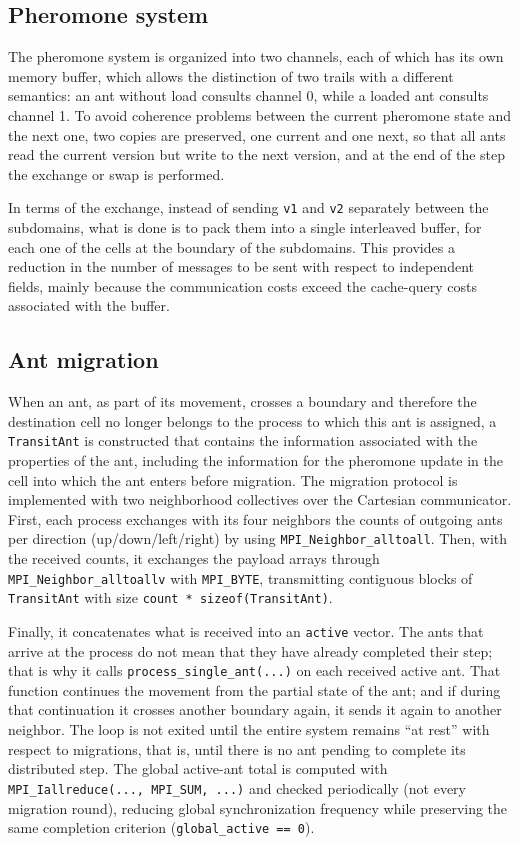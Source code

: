 \subsection{Pheromone system}
The pheromone system is organized into two channels, each of which has its own memory buffer, which allows the distinction of two trails with a different semantics: an ant without load consults channel 0, while a loaded ant consults channel 1. To avoid coherence problems between the current pheromone state and the next one, two copies are preserved, one current and one next, so that all ants read the current version but write to the next version, and at the end of the step the exchange or swap is performed.

In terms of the exchange, instead of sending \texttt{v1} and \texttt{v2} separately between the subdomains, what is done is to pack them into a single interleaved buffer, for each one of the cells at the boundary of the subdomains. This provides a reduction in the number of messages to be sent with respect to independent fields, mainly because the communication costs exceed the cache-query costs associated with the buffer.




\subsection{Ant migration}


When an ant, as part of its movement, crosses a boundary and therefore the destination cell no longer belongs to the process to which this ant is assigned, a \texttt{TransitAnt} is constructed that contains the information associated with the properties of the ant, including the information for the pheromone update in the cell into which the ant enters before migration. The migration protocol is implemented with two neighborhood collectives over the Cartesian communicator. First, each process exchanges with its four neighbors the counts of outgoing ants per direction (up/down/left/right) by using \texttt{MPI\_Neighbor\_alltoall}. Then, with the received counts, it exchanges the payload arrays through \texttt{MPI\_Neighbor\_alltoallv} with \texttt{MPI\_BYTE}, transmitting contiguous blocks of \texttt{TransitAnt} with size \texttt{count * sizeof(TransitAnt)}.

Finally, it concatenates what is received into an \texttt{active} vector. The ants that arrive at the process do not mean that they have already completed their step; that is why it calls \texttt{process\_single\_ant(...)} on each received active ant. That function continues the movement from the partial state of the ant; and if during that continuation it crosses another boundary again, it sends it again to another neighbor. The loop is not exited until the entire system remains ``at rest'' with respect to migrations, that is, until there is no ant pending to complete its distributed step. The global active-ant total is computed with \texttt{MPI\_Iallreduce(..., MPI\_SUM, ...)} and checked periodically (not every migration round), reducing global synchronization frequency while preserving the same completion criterion (\texttt{global\_active == 0}).


